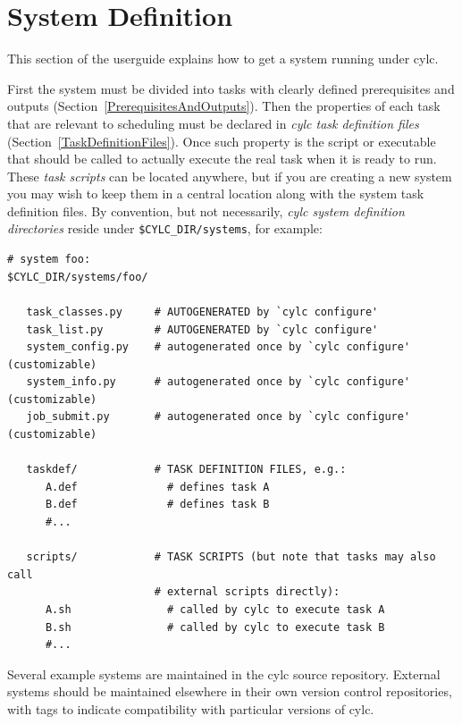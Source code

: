 \documentclass[11pt,a4paper]{article}
\begin{document}
\pagebreak
\section{System Definition} 
\label{SystemDefinition}

This section of the userguide explains how to get a system running under
cylc.


First the system must be divided into tasks with clearly defined
prerequisites and outputs (Section~\ref{PrerequisitesAndOutputs}). Then
the properties of each task that are relevant to scheduling must be
declared in {\em cylc task definition files}
(Section~\ref{TaskDefinitionFiles}). Once such property is the script or
executable that should be called to actually execute the real task when
it is ready to run. These {\em task scripts} can be located anywhere,
but if you are creating a new system you may wish to keep them in a
central location along with the system task definition files.  By
convention, but not necessarily, {\em cylc system definition
directories} reside under \lstinline=$CYLC_DIR/systems=, for example:

\lstset{language=bash}

\begin{lstlisting}
# system foo:
$CYLC_DIR/systems/foo/

   task_classes.py     # AUTOGENERATED by `cylc configure' 
   task_list.py        # AUTOGENERATED by `cylc configure' 
   system_config.py    # autogenerated once by `cylc configure' (customizable)
   system_info.py      # autogenerated once by `cylc configure' (customizable)
   job_submit.py       # autogenerated once by `cylc configure' (customizable)

   taskdef/            # TASK DEFINITION FILES, e.g.:
      A.def              # defines task A
      B.def              # defines task B
      #...

   scripts/            # TASK SCRIPTS (but note that tasks may also call
                       # external scripts directly):
      A.sh               # called by cylc to execute task A
      B.sh               # called by cylc to execute task B
      #...
\end{lstlisting}

Several example systems are maintained in the cylc source repository.
External systems should be maintained elsewhere in their own version
control repositories, with tags to indicate compatibility with
particular versions of cylc.
\end{document}
